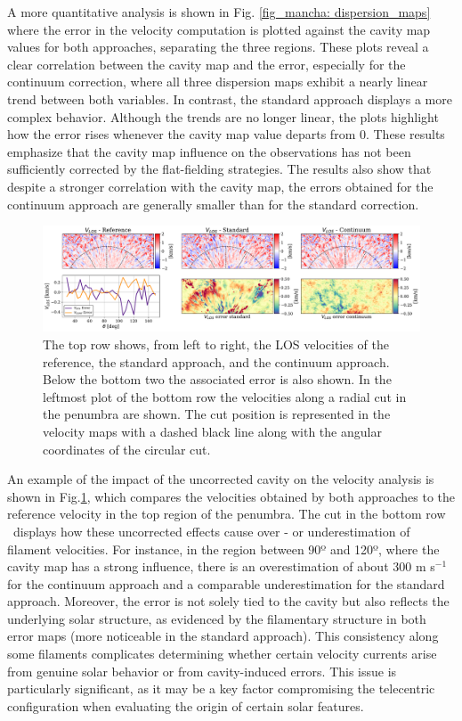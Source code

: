 A more quantitative analysis is shown in Fig. \ref{fig_mancha: dispersion_maps} where the error in the velocity computation is plotted against the cavity map values for both approaches, separating the three regions. These plots reveal a clear correlation between the cavity map and the error, especially for the continuum correction, where all three dispersion maps exhibit a nearly linear trend between both variables. In contrast, the standard approach displays a more complex behavior. Although the trends are no longer linear, the plots highlight how the error rises whenever the cavity map value departs from 0. These results emphasize that the cavity map influence on the observations has not been sufficiently corrected by the flat-fielding strategies. The results also show that despite a stronger correlation with the cavity map, the errors obtained for the continuum approach are generally smaller than for the standard correction.

\begin{figure}[t]
  \includegraphics[width=\textwidth]{figures/Mancha/vlos_circular_cut_new.pdf}
  \caption[Velocity error, radial cut.]{The top row shows, from left to right, the LOS velocities of the reference, the standard approach, and the continuum approach. Below the bottom two the associated error is also shown. In the leftmost plot of the bottom row the velocities along a radial cut in the penumbra are shown. The cut position is represented in the velocity maps with a dashed black line along with the angular coordinates of the circular cut.\label{fig_mancha: verror_circular_cut}}
\end{figure}


An example of the impact of the uncorrected cavity on the velocity analysis is shown in Fig.\ref{fig_mancha: verror_circular_cut}, which compares the velocities obtained by both approaches to the reference velocity in the top region of the penumbra. The cut in the bottom row ~displays how these uncorrected effects cause over - or underestimation of filament velocities. For instance, in the region between 90º and 120º, where the cavity map has a strong influence, there is an overestimation of about 300 m s\(^{-1}\) for the continuum approach and a comparable underestimation for the standard approach. Moreover, the error is not solely tied to the cavity but also reflects the underlying solar structure, as evidenced by the filamentary structure in both error maps (more noticeable in the standard approach). This consistency along some filaments complicates determining whether certain velocity currents arise from genuine solar behavior or from cavity-induced errors. This issue is particularly significant, as it may be a key factor compromising the telecentric configuration when evaluating the origin of certain solar features.


